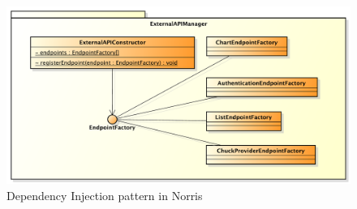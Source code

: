 	    		\begin{figure}[H]\centering
	        		\includegraphics[width=\textwidth]{SpecificaTecnica/Pics/DesignPatternNorris/DependencyInjection3}
	        		\caption{Dependency Injection pattern in Norris}
	    		\end{figure}	
				
